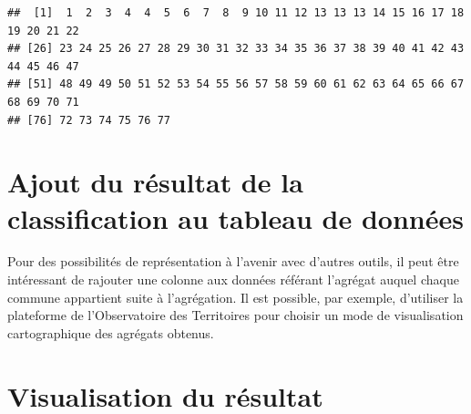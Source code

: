 \documentclass[
]{article}
\newenvironment{Shaded}{\begin{snugshade}}{\end{snugshade}}
\newcommand{\CommentTok}[1]{\textcolor[rgb]{0.56,0.35,0.01}{\textit{#1}}}
\newcommand{\NormalTok}[1]{#1}
\newcommand{\OtherTok}[1]{\textcolor[rgb]{0.56,0.35,0.01}{#1}}
\newcommand{\SpecialCharTok}[1]{\textcolor[rgb]{0.00,0.00,0.00}{#1}}
\begin{document}
\begin{verbatim}
##  [1]  1  2  3  4  4  5  6  7  8  9 10 11 12 13 13 13 14 15 16 17 18 19 20 21 22
## [26] 23 24 25 26 27 28 29 30 31 32 33 34 35 36 37 38 39 40 41 42 43 44 45 46 47
## [51] 48 49 49 50 51 52 53 54 55 56 57 58 59 60 61 62 63 64 65 66 67 68 69 70 71
## [76] 72 73 74 75 76 77
\end{verbatim}

\hypertarget{ajout-du-ruxe9sultat-de-la-classification-au-tableau-de-donnuxe9es}{%
\section{Ajout du résultat de la classification au tableau de
données}\label{ajout-du-ruxe9sultat-de-la-classification-au-tableau-de-donnuxe9es}}

Pour des possibilités de représentation à l'avenir avec d'autres outils,
il peut être intéressant de rajouter une colonne aux données référant
l'agrégat auquel chaque commune appartient suite à l'agrégation. Il est
possible, par exemple, d'utiliser la plateforme de l'Observatoire des
Territoires pour choisir un mode de visualisation cartographique des
agrégats obtenus.

\begin{Shaded}
\end{Shaded}

\hypertarget{visualisation-du-ruxe9sultat}{%
\section{Visualisation du résultat}\label{visualisation-du-ruxe9sultat}}
\end{document}
